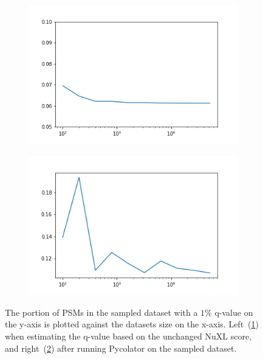 \begin{figure}
	\normalsize
	\centering
	\begin{subfigure}{0.49 \textwidth}
		\includegraphics[width = \textwidth]{figures/ratio_idents_whole_df_NuXL.png}
		\caption{}
		\label{fig:results:small_dataset_first_ratio_dxl}
	\end{subfigure}
	\hfill
	\begin{subfigure}{0.49 \textwidth}
		\includegraphics[width = \textwidth]{figures/ratio_idents_whole_df_percolator.png}
		\caption{}
		\label{fig:results:small_dataset_first_auc_ratio_pxl}
	\end{subfigure}
	\caption[Portion of high-confidence PSMs in different dataset sizes]{The portion of PSMs in the sampled dataset with a $1\%$ q-value on the y-axis is plotted against the datasets size on the x-axis. Left~(\ref{fig:results:small_dataset_first_ratio_dxl}) when estimating the q-value based on the unchanged NuXL score, and right~(\ref{fig:results:small_dataset_first_auc_ratio_pxl}) after running Pycolator on the sampled dataset.}
	\label{fig:results:small_dataset_first_auc_ratio}
\end{figure}
